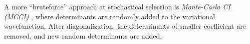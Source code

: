 \documentclass[./thesis.tex]{subfiles}
\begin{document}
A more ``bruteforce'' approach at stochastical selection is \emph{Monte-Carlo CI (MCCI)} \cite{Greer_1995,Greer_1998}, where determinants are randomly added to the variational wavefunction. After diagonalization, the determinants of smaller coefficient are removed, and new random determinants are added.
\end{document}

